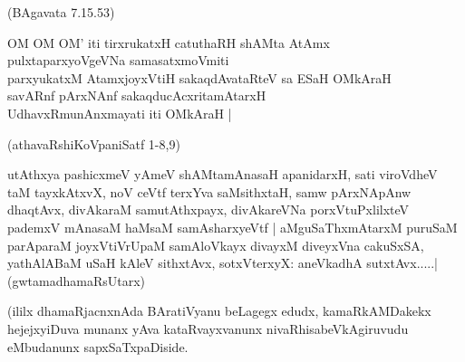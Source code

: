 \begin{itemize}
{\hfill{(BAgavata 7.15.53)}
\item[21.] OM OM OM' iti tirxrukatxH catuthaRH shAMta AtAmx\\\label{146a}
pulxtaparxyoVgeVNa samasatxmoVmiti\\
parxyukatxM AtamxjoyxVtiH sakaqdAvataRteV sa ESaH OMkAraH\\
savARnf pArxNAnf sakaqducAcxritamAtarxH \\
UdhavxRmunAnxmayati iti OMkAraH |

\hfill{(athavaRshiKoVpaniSatf 1-8,9)} 
\item[22.] utAthxya pashicxmeV yAmeV shAMtamAnasaH apanidarxH,
sati viroVdheV taM tayxkAtxvX,
noV ceVtf terxYva saMsithxtaH, samw pArxNApAnw
dhaqtAvx, divAkaraM samutAthxpayx,
divAkareVNa porxVtuPxlilxteV pademxV mAnasaM haMsaM samAsharxyeVtf |
aMguSaThxmAtarxM puruSaM parAparaM joyxVtiVrUpaM samAloVkayx 
divayxM diveyxVna cakuSxSA, yathAlABaM uSaH kAleV sithxtAvx, sotxVterxyX: 
aneVkadhA sutxtAvx.....|\label{146b}
\hfill{(gwtamadhamaRsUtarx)}}
\end{itemize}

\noindent
(ililx dhamaRjacnxnAda BAratiVyanu beLagegx edudx, kamaRkAMDakekx hejejxyiDuva munanx yAva kataRvayxvanunx nivaRhisabeVkAgiruvudu eMbudanunx sapxSaTxpaDiside. 

